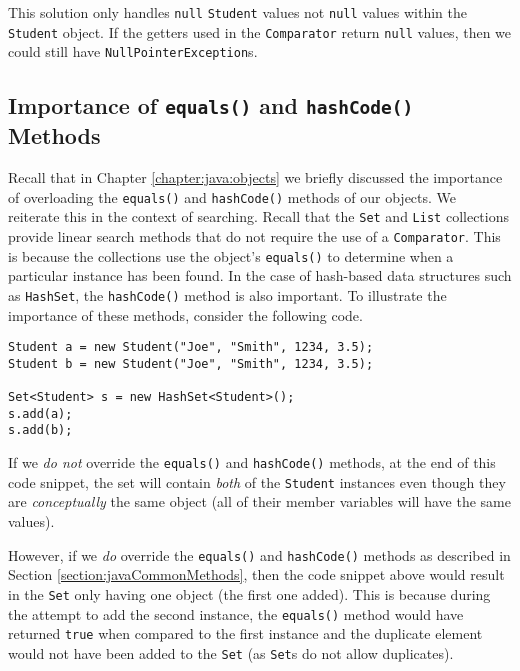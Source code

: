 This solution only handles \texttt{null} \texttt{Student}
values not \texttt{null} values within the \texttt{Student}
object.  If the getters used in the \texttt{Comparator} return
\texttt{null} values, then we could still have 
\texttt{NullPointerException}s.  


\subsection{Importance of \texttt{equals()} and \texttt{hashCode()} Methods}
\label{subsection:importanceOfEqualsHashCode}

Recall that in Chapter \ref{chapter:java:objects} we briefly discussed the
importance of overloading the \texttt{equals()} and 
\texttt{hashCode()} methods of our objects.  We reiterate this
in the context of searching.  Recall that the \texttt{Set} and
\texttt{List} collections provide linear search methods that do
not require the use of a \texttt{Comparator}.  This is because
the collections use the object's \texttt{equals()} to determine 
when a particular instance has been found.  In the case of hash-based 
data structures such as \texttt{HashSet}, the
\texttt{hashCode()} method is also important.
To illustrate the importance of these methods, consider the following 
code.

\begin{verbatim}
Student a = new Student("Joe", "Smith", 1234, 3.5);		
Student b = new Student("Joe", "Smith", 1234, 3.5);
		
Set<Student> s = new HashSet<Student>();
s.add(a);
s.add(b);
\end{verbatim}

If we \emph{do not} override the \texttt{equals()} and
\texttt{hashCode()} methods, at the end of this code 
snippet, the set will contain \emph{both} of the \texttt{Student}
instances even though they are \emph{conceptually} the same object
(all of their member variables will have the same values).  

However, if we \emph{do} override the \texttt{equals()} and
\texttt{hashCode()} methods as described in Section 
\ref{section:javaCommonMethods}, then the code snippet above would
result in the \texttt{Set} only having one object (the
first one added).  This is because during the attempt to add the second
instance, the \texttt{equals()} method would have returned
\texttt{true} when compared to the first instance and the
duplicate element would not have been added to the \texttt{Set}
(as \texttt{Set}s do not allow duplicates).

